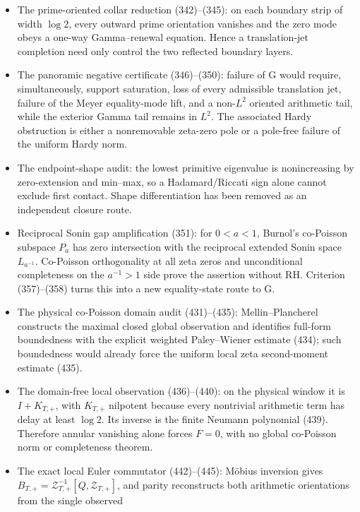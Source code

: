 \documentclass[11pt]{article}
\begin{document}
\begin{itemize}
\item The prime-oriented collar reduction (342)--(345): on each boundary
      strip of width $\log2$, every outward prime orientation vanishes and
      the zero mode obeys a one-way Gamma--renewal equation.  Hence a
      translation-jet completion need only control the two reflected boundary
      layers.
\item The panoramic negative certificate (346)--(350): failure of G would
      require, simultaneously, support saturation, loss of every admissible
      translation jet, failure of the Meyer equality-mode lift, and a
      non-$L^2$ oriented arithmetic tail, while the exterior Gamma tail
      remains in $L^2$.  The associated Hardy obstruction is either a
      nonremovable zeta-zero pole or a pole-free failure of the uniform Hardy
      norm.
\item The endpoint-shape audit: the lowest primitive eigenvalue is
      nonincreasing by zero-extension and min--max, so a Hadamard/Riccati sign
      alone cannot exclude first contact.  Shape differentiation has been
      removed as an independent closure route.
\item Reciprocal Sonin gap amplification (351): for $0<a<1$, Burnol's
      co-Poisson subspace $P_a$ has zero intersection with the reciprocal
      extended Sonin space $L_{a^{-1}}$.  Co-Poisson orthogonality at all zeta
      zeros and unconditional completeness on the $a^{-1}>1$ side prove the
      assertion without RH.  Criterion (357)--(358) turns this into a new
      equality-state route to G.
\item The physical co-Poisson domain audit (431)--(435): Mellin--Plancherel
      constructs the maximal closed global observation and identifies
      full-form boundedness with the explicit weighted Paley--Wiener estimate
      (434); such boundedness would already force the uniform local zeta
      second-moment estimate (435).
\item The domain-free local observation (436)--(440): on the physical window
      it is $I+K_{T,+}$, with $K_{T,+}$ nilpotent because every nontrivial
      arithmetic term has delay at least $\log2$.  Its inverse is the finite
      Neumann polynomial (439).  Therefore annular vanishing alone forces
      $F=0$, with no global co-Poisson norm or completeness theorem.
\item The exact local Euler commutator (442)--(445): Möbius inversion gives
      \(B_{T,+}=\mathcal Z_{T,+}^{-1}[Q,\mathcal Z_{T,+}]\), and parity
      reconstructs both arithmetic orientations from the single observed

\end{itemize}
\end{document}

